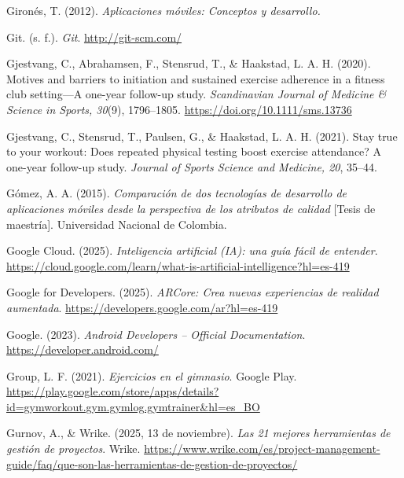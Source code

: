 \begin{referenciasapa}
\item Gironés, T. (2012). \textit{Aplicaciones móviles: Conceptos y desarrollo.}

\item Git. (s. f.). \textit{Git}. \url{http://git-scm.com/}

\item Gjestvang, C., Abrahamsen, F., Stensrud, T., \& Haakstad, L. A. H. (2020). Motives and barriers to initiation and sustained exercise adherence in a fitness club setting---A one-year follow-up study. \textit{Scandinavian Journal of Medicine \& Science in Sports, 30}(9), 1796--1805. \url{https://doi.org/10.1111/sms.13736}

\item Gjestvang, C., Stensrud, T., Paulsen, G., \& Haakstad, L. A. H. (2021). Stay true to your workout: Does repeated physical testing boost exercise attendance? A one-year follow-up study. \textit{Journal of Sports Science and Medicine, 20}, 35--44.

\item Gómez, A. A. (2015). \textit{Comparación de dos tecnologías de desarrollo de aplicaciones móviles desde la perspectiva de los atributos de calidad} [Tesis de maestría]. Universidad Nacional de Colombia.

\item Google Cloud. (2025). \textit{Inteligencia artificial (IA): una guía fácil de entender}. \url{https://cloud.google.com/learn/what-is-artificial-intelligence?hl=es-419}

\item Google for Developers. (2025). \textit{ARCore: Crea nuevas experiencias de realidad aumentada}. \url{https://developers.google.com/ar?hl=es-419}

\item Google. (2023). \textit{Android Developers -- Official Documentation}. \url{https://developer.android.com/}

\item Group, L. F. (2021). \textit{Ejercicios en el gimnasio}. Google Play. \url{https://play.google.com/store/apps/details?id=gymworkout.gym.gymlog.gymtrainer&hl=es_BO}

\item Gurnov, A., \& Wrike. (2025, 13 de noviembre). \textit{Las 21 mejores herramientas de gestión de proyectos}. Wrike. \url{https://www.wrike.com/es/project-management-guide/faq/que-son-las-herramientas-de-gestion-de-proyectos/}


\end{referenciasapa}
